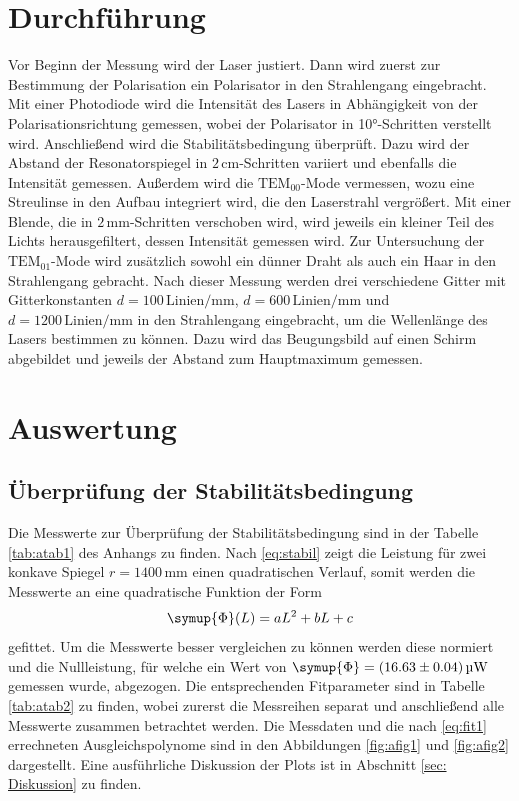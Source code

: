 \section{Durchführung}
Vor Beginn der Messung wird der Laser justiert. 
Dann wird zuerst zur Bestimmung der Polarisation ein Polarisator in den Strahlengang eingebracht. Mit einer Photodiode
wird die Intensität des Lasers in Abhängigkeit von der Polarisationsrichtung gemessen, wobei der Polarisator in
10°-Schritten verstellt wird. 
Anschließend wird die Stabilitätsbedingung überprüft. Dazu wird der Abstand der Resonatorspiegel in $2 \, \si{\centi\meter}$-Schritten
variiert und ebenfalls die Intensität gemessen. 
Außerdem wird die $\text{TEM}_{00}$-Mode vermessen, wozu eine Streulinse in den Aufbau integriert wird, die den Laserstrahl vergrößert.
Mit einer Blende, die in $2 \, \si{\milli\meter}$-Schritten verschoben wird, wird jeweils ein kleiner Teil des Lichts 
herausgefiltert, dessen Intensität gemessen wird. 
Zur Untersuchung der $\text{TEM}_{01}$-Mode wird zusätzlich sowohl ein dünner Draht als auch ein Haar in den Strahlengang gebracht.
Nach dieser Messung werden drei verschiedene Gitter mit Gitterkonstanten $d = 100 \, \text{Linien} / \si{\milli\meter}$, $d = 600 \, \text{Linien} / \si{\milli\meter}$ und $d = 1200 \, \text{Linien} / \si{\milli\meter}$
in den Strahlengang eingebracht, um die Wellenlänge des Lasers bestimmen zu können. Dazu wird das Beugungsbild 
auf einen Schirm abgebildet und jeweils der Abstand zum Hauptmaximum gemessen.


\section{Auswertung}
\subsection{Überprüfung der Stabilitätsbedingung}
Die Messwerte zur Überprüfung der Stabilitätsbedingung sind in der Tabelle \ref{tab:atab1} des Anhangs zu finden.
Nach \eqref{eq:stabil} zeigt die Leistung für zwei konkave Spiegel $r=1400\,\si{\mm}$ einen quadratischen Verlauf, somit werden die Messwerte an eine quadratische Funktion der Form
\begin{equation}
    \symup{\Phi}(L) = a L^2 + b L + c \label{eq:fit1}
\end{equation}
gefittet. 
Um die Messwerte besser vergleichen zu können werden diese normiert und die Nullleistung, für welche ein Wert von $\symup{\Phi} = (16.63 \pm 0.04) \, \si{\micro\W}$ gemessen wurde, abgezogen.
Die entsprechenden Fitparameter sind in Tabelle \ref{tab:atab2} zu finden, wobei zurerst die Messreihen separat und anschließend alle Messwerte zusammen betrachtet werden. 
Die Messdaten und die nach \eqref{eq:fit1} errechneten Ausgleichspolynome sind in den Abbildungen \ref{fig:afig1} und \ref{fig:afig2} dargestellt.
Eine ausführliche Diskussion der Plots ist in Abschnitt \ref{sec: Diskussion} zu finden.


